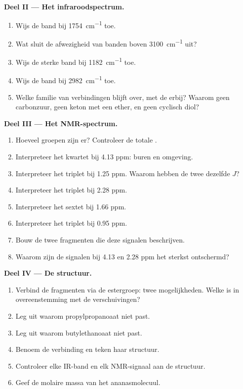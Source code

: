 \begin{problem}
\medskip
\noindent\textbf{Deel II --- Het infraroodspectrum.}
\begin{enumerate}[resume]
  \item Wijs de band bij \qty{1754}{cm^{-1}} toe.
  \item Wat sluit de afwezigheid van banden boven \qty{3100}{cm^{-1}} uit?
  \item Wijs de sterke band bij \qty{1182}{cm^{-1}} toe.
  \item Wijs de band bij \qty{2982}{cm^{-1}} toe.
  \item Welke familie van verbindingen blijft over, met de
         erbij? Waarom geen carbonzuur, geen keton met
        een ether, en geen cyclisch diol?
\end{enumerate}

\medskip
\noindent\textbf{Deel III --- Het NMR-spectrum.}
\begin{enumerate}[resume]
  \item Hoeveel groepen  zijn er? Controleer de totale
        .
  \item Interpreteer het kwartet bij 4.13 ppm: buren en omgeving.
  \item Interpreteer het triplet bij 1.25 ppm. Waarom hebben de twee
        dezelfde $J$?
  \item Interpreteer het triplet bij 2.28 ppm.
  \item Interpreteer het sextet bij 1.66 ppm.
  \item Interpreteer het triplet bij 0.95 ppm.
  \item Bouw de twee fragmenten die deze signalen beschrijven.
  \item Waarom zijn de signalen bij 4.13 en 2.28 ppm het sterkst
        ontschermd?
\end{enumerate}

\medskip
\noindent\textbf{Deel IV --- De structuur.}
\begin{enumerate}[resume]
  \item Verbind de fragmenten via de estergroep: twee mogelijkheden.
        Welke is in overeenstemming met de verschuivingen?
  \item Leg uit waarom propylpropanoaat niet past.
  \item Leg uit waarom butylethanoaat niet past.
  \item Benoem de verbinding en teken haar structuur.
  \item Controleer elke IR-band en elk NMR-signaal aan de structuur.
  \item Geef de molaire massa van het ananasmolecuul.
\end{enumerate}
\end{problem}
